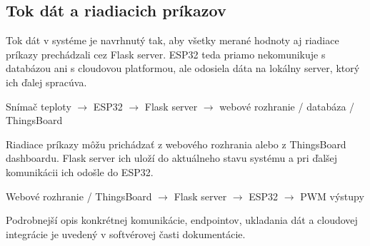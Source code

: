 \subsection{Tok dát a riadiacich príkazov}

Tok dát v systéme je navrhnutý tak, aby všetky merané hodnoty aj riadiace príkazy prechádzali 
cez Flask server. ESP32 teda priamo nekomunikuje s databázou ani s cloudovou platformou, 
ale odosiela dáta na lokálny server, ktorý ich ďalej spracúva.

\begin{center}
Snímač teploty $\rightarrow$ ESP32 $\rightarrow$ Flask server $\rightarrow$ webové rozhranie / databáza / ThingsBoard
\end{center}

Riadiace príkazy môžu prichádzať z webového rozhrania alebo z ThingsBoard dashboardu. Flask server ich uloží do aktuálneho stavu systému a pri ďalšej komunikácii ich odošle do ESP32.

\begin{center}
Webové rozhranie / ThingsBoard $\rightarrow$ Flask server $\rightarrow$ ESP32 $\rightarrow$ PWM výstupy
\end{center}

Podrobnejší opis konkrétnej komunikácie, endpointov, ukladania dát a cloudovej integrácie je 
uvedený v softvérovej časti dokumentácie.